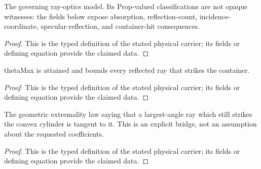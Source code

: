 \begin{definition}
  \label{def:physics:IPhO_2026_2_B_1:aux022}
  The governing ray-optics model. Its Prop-valued classifications are not opaque witnesses: the fields below expose absorption, reflection-count, incidence-coordinate, specular-reflection, and container-hit consequences.
\end{definition}
\begin{proof}
  This is the typed definition of the stated physical carrier; its fields or defining equation provide the claimed data.
\end{proof}

\begin{definition}
  \label{def:physics:IPhO_2026_2_B_1:aux023}
  thetaMax is attained and bounds every reflected ray that strikes the container.
\end{definition}
\begin{proof}
  This is the typed definition of the stated physical carrier; its fields or defining equation provide the claimed data.
\end{proof}

\begin{definition}
  \label{def:physics:IPhO_2026_2_B_1:aux024}
  The geometric extremality law saying that a largest-angle ray which still strikes the convex cylinder is tangent to it. This is an explicit bridge, not an assumption about the requested coefficients.
\end{definition}
\begin{proof}
  This is the typed definition of the stated physical carrier; its fields or defining equation provide the claimed data.
\end{proof}

